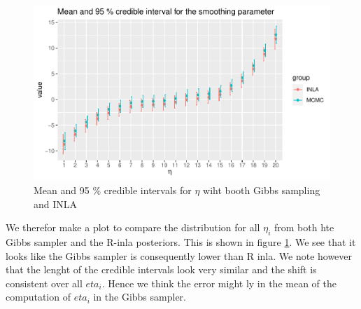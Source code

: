 \begin{figure}[h]
    \centering
    \includegraphics[width=\textwidth]{Images/smoothing_comparison_all eta.pdf}
    \caption{Mean and 95 \% credible intervals for $\eta$ wiht booth Gibbs sampling and INLA}
    \label{fig:eta_all_comp}
\end{figure}

We therefor make a plot to compare the distribution for all $\eta_i$ from both hte Gibbs sampler and the R-inla posteriors. This is shown in figure \ref{fig:eta_all_comp}. We see that it looks like the Gibbs sampler is consequently lower than R inla. We note however that the lenght of the credible intervals look very similar and the shift is consistent over all $eta_i$. Hence we think the error might ly in the mean of the computation of $eta_i$ in the Gibbs sampler.  